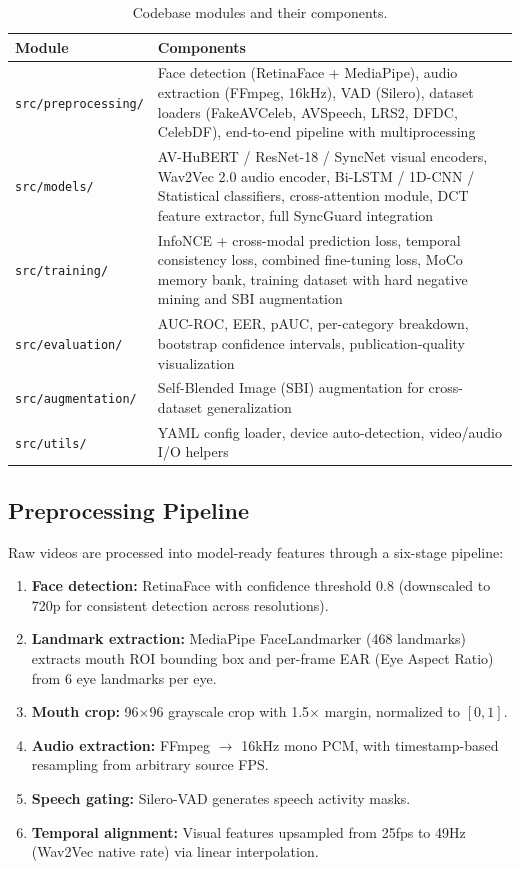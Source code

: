 \documentclass[12pt, letterpaper]{article}
\begin{document}
\renewcommand{\arraystretch}{1.5}
\begin{table}[H]
\centering
\begin{tabularx}{\textwidth}{@{} p{3.2cm} X @{}}
\toprule
\textbf{Module} & \textbf{Components} \\
\midrule
\texttt{src/preprocessing/} & Face detection (RetinaFace + MediaPipe), audio extraction (FFmpeg, 16kHz), VAD (Silero), dataset loaders (FakeAVCeleb, AVSpeech, LRS2, DFDC, CelebDF), end-to-end pipeline with multiprocessing \\
\texttt{src/models/} & AV-HuBERT / ResNet-18 / SyncNet visual encoders, Wav2Vec 2.0 audio encoder, Bi-LSTM / 1D-CNN / Statistical classifiers, cross-attention module, DCT feature extractor, full SyncGuard integration \\
\texttt{src/training/} & InfoNCE + cross-modal prediction loss, temporal consistency loss, combined fine-tuning loss, MoCo memory bank, training dataset with hard negative mining and SBI augmentation \\
\texttt{src/evaluation/} & AUC-ROC, EER, pAUC, per-category breakdown, bootstrap confidence intervals, publication-quality visualization \\
\texttt{src/augmentation/} & Self-Blended Image (SBI) augmentation for cross-dataset generalization \\
\texttt{src/utils/} & YAML config loader, device auto-detection, video/audio I/O helpers \\
\bottomrule
\end{tabularx}
\caption{Codebase modules and their components.}
\end{table}
\renewcommand{\arraystretch}{1.0}

\subsection{Preprocessing Pipeline}

Raw videos are processed into model-ready features through a six-stage pipeline:

\begin{enumerate}[itemsep=2pt, leftmargin=1.5em]
    \item \textbf{Face detection:} RetinaFace with confidence threshold 0.8 (downscaled to 720p for consistent detection across resolutions).
    \item \textbf{Landmark extraction:} MediaPipe FaceLandmarker (468 landmarks) extracts mouth ROI bounding box and per-frame EAR (Eye Aspect Ratio) from 6 eye landmarks per eye.
    \item \textbf{Mouth crop:} 96$\times$96 grayscale crop with 1.5$\times$ margin, normalized to $[0, 1]$.
    \item \textbf{Audio extraction:} FFmpeg $\to$ 16kHz mono PCM, with timestamp-based resampling from arbitrary source FPS.
    \item \textbf{Speech gating:} Silero-VAD generates speech activity masks.
    \item \textbf{Temporal alignment:} Visual features upsampled from 25fps to 49Hz (Wav2Vec native rate) via linear interpolation.
\end{enumerate}
\end{document}
